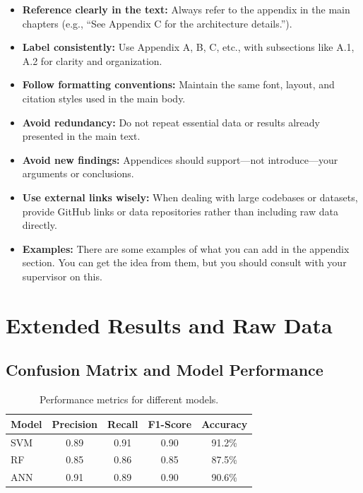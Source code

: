 \documentclass[a4paper,11pt]{report}
\begin{document}
\begin{itemize}
  \item \textbf{Reference clearly in the text:} Always refer to the appendix in the main chapters (e.g., ``See Appendix C for the architecture details.'').
  \item \textbf{Label consistently:} Use Appendix A, B, C, etc., with subsections like A.1, A.2 for clarity and organization.
  \item \textbf{Follow formatting conventions:} Maintain the same font, layout, and citation styles used in the main body.
  \item \textbf{Avoid redundancy:} Do not repeat essential data or results already presented in the main text.
  \item \textbf{Avoid new findings:} Appendices should support—not introduce—your arguments or conclusions.
  \item \textbf{Use external links wisely:} When dealing with large codebases or datasets, provide GitHub links or data repositories rather than including raw data directly.
  \item \textbf{Examples:} There are some examples of what you can add in the appendix section. You can get the idea from them, but you should consult with your supervisor on this.
\end{itemize}

\chapter{Extended Results and Raw Data}
\label{appendix:rawdata}

\section*{Confusion Matrix and Model Performance}
\begin{table}[h!]
\centering
\setlength{\tabcolsep}{6pt}
\renewcommand{\arraystretch}{1.3}
\begin{tabular}{l c c c c }
\hline
Model & Precision & Recall & F1-Score & Accuracy \\
\hline
SVM   & 0.89      & 0.91   & 0.90     & 91.2\% \\
RF    & 0.85      & 0.86   & 0.85     & 87.5\% \\
ANN   & 0.91      & 0.89   & 0.90     & 90.6\% \\
\hline
\end{tabular}
\caption{Performance metrics for different models.}
\end{table}
\end{document}
